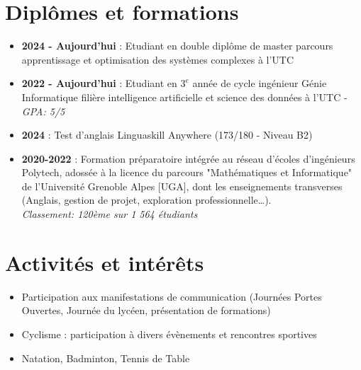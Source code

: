 \documentclass[9pt, oneside, a4paper, titlepage]{extarticle}
\begin{document}
\begin{tcolorbox}
\begin{minipage}[t]{12.8cm}
\begin{tcolorbox}[grow to right by = 0.6cm, colback = gray!25, colframe = white]
                \section*{Diplômes et formations }
                \begin{itemize}
                    \item \textbf{2024 - Aujourd'hui }: Etudiant en double diplôme de master parcours apprentissage et optimisation des systèmes complexes à l'UTC
                    \item \textbf{2022 - Aujourd'hui }: Etudiant en $3^{e}$ année de cycle ingénieur Génie Informatique filière intelligence artificielle et science des données à l'UTC - \emph{GPA: 5/5}        
                    \item \textbf{2024 }: Test d'anglais Linguaskill Anywhere (173/180 - Niveau B2)
                    \item \textbf{2020-2022 }: Formation préparatoire intégrée au réseau d’écoles d’ingénieurs Polytech, adossée à la licence du parcours "Mathématiques et Informatique" de l’Université Grenoble Alpes [UGA], dont les enseignements transverses (Anglais, gestion de projet, exploration professionnelle\ldots).\\\emph{Classement: 120ème sur 1 564 étudiants}
                \end{itemize}
                \section*{Activités et intérêts}

                \begin{itemize}
                    \item Participation aux manifestations de communication (Journées Portes Ouvertes, Journée du lycéen, présentation de formations)
                    \item Cyclisme : participation à divers évènements et rencontres sportives
                    \item Natation, Badminton, Tennis de Table
                    
                \end{itemize}
                    
            \end{tcolorbox}
        \end{minipage}
    \end{tcolorbox}
\end{document}
